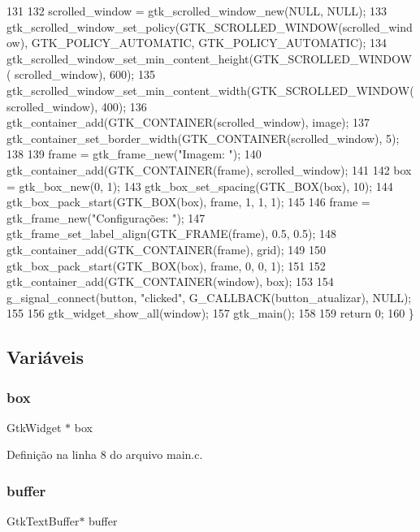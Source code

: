 \begin{DoxyCode}
131 
132     scrolled_window = gtk\_scrolled\_window\_new(NULL, NULL);
133     gtk\_scrolled\_window\_set\_policy(GTK\_SCROLLED\_WINDOW(scrolled_window), GTK\_POLICY\_AUTOMATIC, 
      GTK\_POLICY\_AUTOMATIC);
134     gtk\_scrolled\_window\_set\_min\_content\_height(GTK\_SCROLLED\_WINDOW(
      scrolled_window), 600);
135     gtk\_scrolled\_window\_set\_min\_content\_width(GTK\_SCROLLED\_WINDOW(
      scrolled_window), 400);
136     gtk\_container\_add(GTK\_CONTAINER(scrolled_window), image);
137     gtk\_container\_set\_border\_width(GTK\_CONTAINER(scrolled_window), 5);
138 
139     frame = gtk\_frame\_new(\textcolor{stringliteral}{"Imagem: "});
140     gtk\_container\_add(GTK\_CONTAINER(frame), scrolled_window);
141 
142     box = gtk\_box\_new(0, 1);
143     gtk\_box\_set\_spacing(GTK\_BOX(box), 10);
144     gtk\_box\_pack\_start(GTK\_BOX(box), frame, 1, 1, 1);
145 
146     frame = gtk\_frame\_new(\textcolor{stringliteral}{"Configurações: "});
147     gtk\_frame\_set\_label\_align(GTK\_FRAME(frame), 0.5, 0.5);
148     gtk\_container\_add(GTK\_CONTAINER(frame), grid);
149 
150     gtk\_box\_pack\_start(GTK\_BOX(box), frame, 0, 0, 1);
151 
152     gtk\_container\_add(GTK\_CONTAINER(window), box);
153 
154     g\_signal\_connect(button, \textcolor{stringliteral}{"clicked"}, G\_CALLBACK(button\_atualizar), NULL);
155 
156     gtk\_widget\_show\_all(window);
157     gtk\_main();
158 
159     \textcolor{keywordflow}{return} 0;
160 \}
\end{DoxyCode}


\subsection{Variáveis}
\mbox{\label{main_8c_abc275800552626c57c494a8043fbbb9a}} 
\subsubsection{box}
{\footnotesize\ttfamily Gtk\+Widget $\ast$ box}



Definição na linha 8 do arquivo main.\+c.

\mbox{\label{main_8c_a9860d266405c74e89a2023a30fc83aba}} 
\subsubsection{buffer}
{\footnotesize\ttfamily Gtk\+Text\+Buffer$\ast$ buffer}



